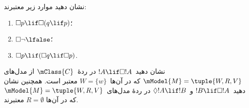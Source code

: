 \documentclass[../../../include/open-logic-section]{subfiles}
\begin{document}
\begin{prob}
  نشان دهید موارد زیر معتبرند:
  \begin{enumerate}
  \item $\Box p \lif \Box (q \lif p)$؛
  \item $\Box \lnot \lfalse$؛
  \item $\Box p \lif (\Box q \lif \Box p)$.
  \end{enumerate}
\end{prob}

\begin{prob}
  نشان دهید~$!A \lif \Box!A$ در ردهٔ~$\mClass{C}$ از مدل‌های
  $\mModel{M} = \tuple{W, R, V}$ که در آن‌ها~$W = \{w\}$ معتبر است.
  همچنین نشان دهید~$!B \lif \Box !A$ و~$\Diamond !A \lif !B$ در ردهٔ
  مدل‌های~$\mModel{M} = \tuple{W, R, V}$ که در آن‌ها
  $R = \emptyset$ معتبرند.
\end{prob}
\end{document}
